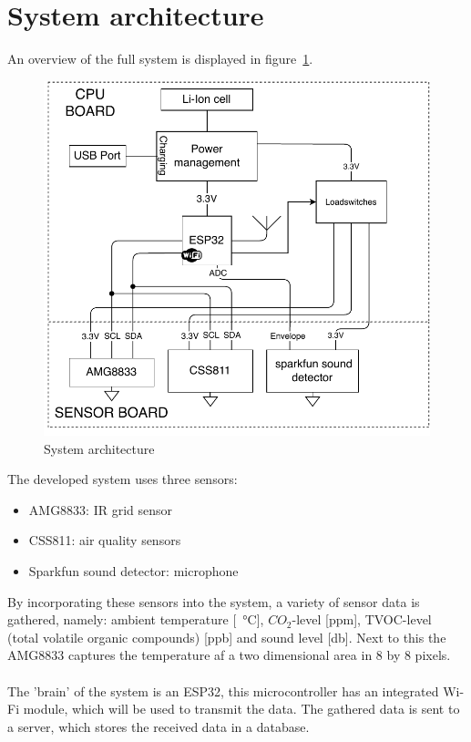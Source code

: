 \documentclass[11pt,a4paper]{article}
\begin{document}
\section{System architecture}
An overview of the full system is displayed in figure~\ref{fig:architecture}.
\begin{figure}[!ht]
	\centering
	\includegraphics[width=1.0\linewidth]{architecture.pdf}
	\caption{System architecture}
	\label{fig:architecture}
\end{figure}
The developed system uses three sensors: 
\begin{itemize}
	\item AMG8833: IR grid sensor
	\item CSS811: air quality sensors
	\item Sparkfun sound detector: microphone
\end{itemize}
By incorporating these sensors into the system, a variety of sensor data is gathered, namely: ambient temperature [\SI{}{\celsius}], $CO_2$-level [ppm], TVOC-level (total volatile organic compounds) [ppb] and sound level [db]. Next to this the AMG8833 captures the temperature af a two dimensional area in 8 by 8 pixels. 
\\ \\
The 'brain' of the system is an ESP32, this microcontroller has an integrated Wi-Fi module, which will be used to transmit the data. The gathered data is sent to a server, which stores the received data in a database. 
\end{document}

